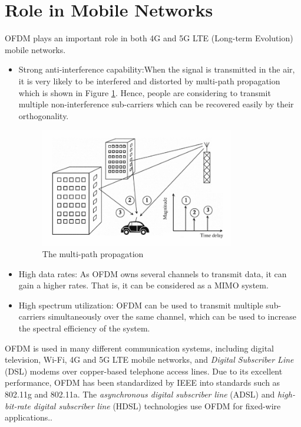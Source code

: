\documentclass{article}
\numberwithin{figure}{section}
\begin{document}
\section{Role in Mobile Networks}
OFDM plays an important role in both 4G and 5G LTE (Long-term Evolution) mobile networks.
\begin{itemize}
    \item Strong anti-interference capability:When the signal is transmitted in the air, it is very likely to be interfered and distorted by multi-path propagation which is shown in Figure \ref{fig:multipath propagation}. Hence, people are considering to transmit multiple non-interference sub-carriers which can be recovered easily by their orthogonality.
    \begin{figure}[!ht]
        \centering
        \includegraphics[width=0.8\textwidth]{images/multipath propagation.png}
        \caption{\label{fig:multipath propagation}The multi-path propagation}
    \end{figure}
    \item High data rates: As OFDM owns several channels to transmit data, it can gain a higher rates. That is, it can be considered as a MIMO system.
    \item High spectrum utilization: OFDM can be used to transmit multiple sub-carriers simultaneously over the same channel, which can be used to increase the spectral efficiency of the system.
\end{itemize}

OFDM is used in many different communication systems, including digital television, Wi-Fi, 4G and 5G LTE  mobile networks, and \textit{Digital Subscriber Line} (DSL) modems over copper-based telephone access lines. Due to its excellent performance, OFDM has been standardized by IEEE into standards such as 802.11g and 802.11a. The \textit{asynchronous digital subscriber line} (ADSL) and \textit{high-bit-rate digital subscriber line} (HDSL) technologies use OFDM for fixed-wire applications.\cite{RN79, RN81}.
\end{document}
